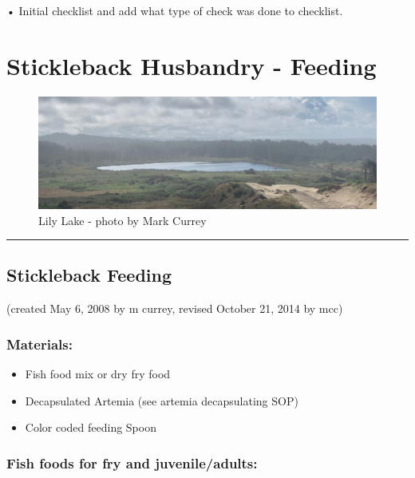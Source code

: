 \documentclass[
]{book}
\providecommand{\tightlist}{%
  \setlength{\itemsep}{0pt}\setlength{\parskip}{0pt}}
\begin{document}
• Initial checklist and add what type of check was done to checklist.

\hypertarget{stickleback-husbandry---feeding}{%
\chapter{Stickleback Husbandry - Feeding}\label{stickleback-husbandry---feeding}}

\begin{figure}
\centering
\includegraphics{images/lily_lake_header.jpg}
\caption{Lily Lake - photo by Mark Currey}
\end{figure}

\begin{center}\rule{0.5\linewidth}{0.5pt}\end{center}

\hypertarget{stickleback-feeding}{%
\section{Stickleback Feeding}\label{stickleback-feeding}}

(created May 6, 2008 by m currey, revised October 21, 2014 by mcc)

\hypertarget{materials}{%
\subsection{Materials:}\label{materials}}

\begin{itemize}
\tightlist
\item
  Fish food mix or dry fry food
\item
  Decapsulated Artemia (see artemia decapsulating SOP)
\item
  Color coded feeding Spoon
\end{itemize}

\hypertarget{fish-foods-for-fry-and-juvenileadults}{%
\subsection{Fish foods for fry and juvenile/adults:}\label{fish-foods-for-fry-and-juvenileadults}}
\end{document}

